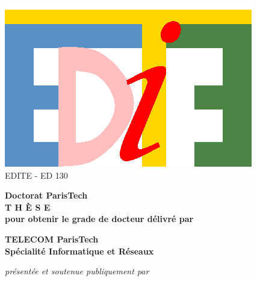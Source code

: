 \vspace{0.cm}
\begin{center}

\includegraphics[scale=0.65]{img/logos/edite.eps} \\
{\small {EDITE - ED 130}}


\vspace{.5cm}


\vspace{1.0cm}

{\LARGE \textbf{Doctorat ParisTech}}\\
\vspace{1.1cm}
{\LARGE \textbf{T H È S E}}\\
\vspace{0.5cm}
{\normalsize \textbf{pour obtenir le grade de docteur délivré par}}\\

\vspace{.9cm}

{\LARGE \textbf{TELECOM ParisTech}}\\
\vspace{0.6cm}
{\Large \textbf{Spécialité Informatique et Réseaux}}\\

\vspace{.8cm}

{\normalsize \textit{présentée et soutenue publiquement par}}\\
\vspace{0.7cm}


\end{center}
